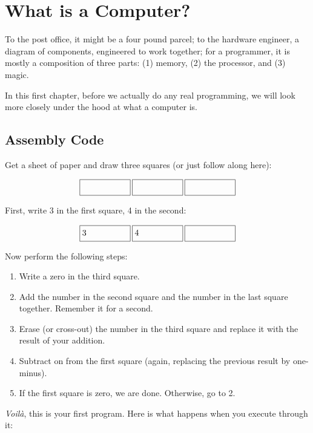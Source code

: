 \chapter{What is a Computer?}

To the post office, it might be a four pound parcel; to the hardware engineer,
a diagram of components, engineered to work together; for a programmer, it is
mostly a composition of three parts: (1) memory, (2) the processor, and (3)
magic.

In this first chapter, before we actually do any real programming, we will look
more closely under the hood at what a computer is.

\section{Assembly Code}%
\newcommand\dorect[1]{\framebox[6em]{\ensuremath{#1}\strut\hfill}}%
\newcommand\dostate[3]{\dorect{#1}\hspace{2pt}\dorect{#2}\hspace{2pt}\dorect{#3}}

Get a sheet of paper and draw three squares (or just follow along here):

\[
\dostate{}{}{}
\]

First, write 3 in the first square, 4 in the second:

\[
\dostate{3}{4}{\strut}
\]

Now perform the following steps:

\begin{enumerate}
\item Write a zero in the third square.
\item Add the number in the second square and the number in the last square
together. Remember it for a second.
\item Erase (or cross-out) the number in the third square and replace it with
the result of your addition.
\item Subtract on from the first square (again, replacing the previous result
by one-minus).
\item If the first square is zero, we are done. Otherwise, go to 2.
\end{enumerate}

\emph{Voilà}, this is your first program. Here is what happens when you execute
through it:

